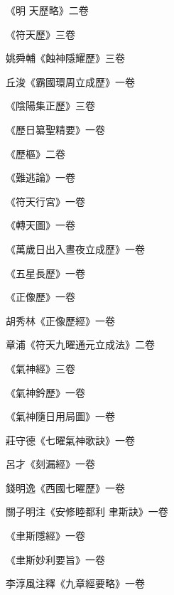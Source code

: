 \begin{pinyinscope}
 《明
 天歷略》二卷



 《符天歷》三卷



 姚舜輔《蝕神隱耀歷》三卷



 丘浚《霸國環周立成歷》一卷



 《陰陽集正歷》三卷



 《歷日纂聖精要》一卷



 《歷樞》二卷



 《難逃論》一卷



 《符天行宮》一卷



 《轉天圖》一卷



 《萬歲日出入晝夜立成歷》一卷



 《五星長歷》一卷



 《正像歷》一卷



 胡秀林《正像歷經》一卷



 章浦《符天九曜通元立成法》二卷



 《氣神經》三卷



 《氣神鈐歷》一卷



 《氣神隨日用局圖》一卷



 莊守德《七曜氣神歌訣》一卷



 呂才《刻漏經》一卷



 錢明逸《西國七曜歷》一卷



 關子明注《安修睦都利
 聿斯訣》一卷



 《聿斯隱經》一卷



 《聿斯妙利要旨》一卷



 李淳風注釋《九章經要略》一卷




\end{pinyinscope}
